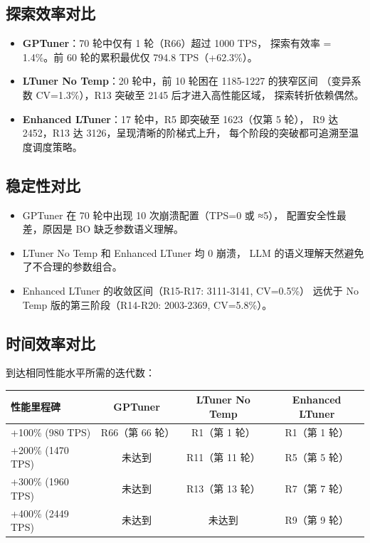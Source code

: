 \subsection{探索效率对比}

\begin{itemize}
  \item \textbf{GPTuner}：70 轮中仅有 1 轮（R66）超过 1000 TPS，
        探索有效率 = 1.4\%。前 60 轮的累积最优仅 794.8 TPS（+62.3\%）。
  \item \textbf{LTuner No Temp}：20 轮中，前 10 轮困在 1185-1227 的狭窄区间
       （变异系数 CV=1.3\%），R13 突破至 2145 后才进入高性能区域，
        探索转折依赖偶然。
  \item \textbf{Enhanced LTuner}：17 轮中，R5 即突破至 1623（仅第 5 轮），
        R9 达 2452，R13 达 3126，呈现清晰的阶梯式上升，
        每个阶段的突破都可追溯至温度调度策略。
\end{itemize}

\subsection{稳定性对比}

\begin{itemize}
  \item GPTuner 在 70 轮中出现 10 次崩溃配置（TPS=0 或 ≈5），
        配置安全性最差，原因是 BO 缺乏参数语义理解。
  \item LTuner No Temp 和 Enhanced LTuner 均 0 崩溃，
        LLM 的语义理解天然避免了不合理的参数组合。
  \item Enhanced LTuner 的收敛区间（R15-R17: 3111-3141, CV=0.5\%）
        远优于 No Temp 版的第三阶段（R14-R20: 2003-2369, CV=5.8\%）。
\end{itemize}

\subsection{时间效率对比}

到达相同性能水平所需的迭代数：

\begin{table}[h]
\centering
\begin{tabular}{l|ccc}
\hline
\textbf{性能里程碑} & \textbf{GPTuner} & \textbf{LTuner No Temp} & \textbf{Enhanced LTuner} \\
\hline
+100\% (980 TPS) & R66（第 66 轮）  & R1（第 1 轮）    & R1（第 1 轮）    \\
+200\% (1470 TPS) & 未达到           & R11（第 11 轮）  & R5（第 5 轮）    \\
+300\% (1960 TPS) & 未达到           & R13（第 13 轮）  & R7（第 7 轮）    \\
+400\% (2449 TPS) & 未达到           & 未达到           & R9（第 9 轮）    \\
\hline
\end{tabular}
\end{table}


